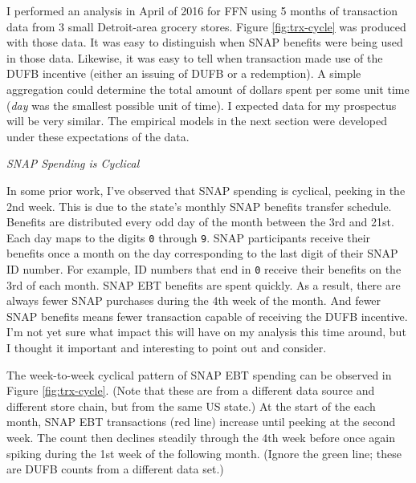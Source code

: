 \documentclass[12pt,letterpaperpaper,]{book}
\begin{document}
I performed an analysis in April of 2016 for FFN using 5 months of
transaction data from 3 small Detroit-area grocery stores. Figure
\ref{fig:trx-cycle} was produced with those data. It was easy to
distinguish when SNAP benefits were being used in those data. Likewise,
it was easy to tell when transaction made use of the DUFB incentive
(either an issuing of DUFB or a redemption). A simple aggregation could
determine the total amount of dollars spent per some unit time
(\emph{day} was the smallest possible unit of time). I expected data for
my prospectus will be very similar. The empirical models in the next
section were developed under these expectations of the data.

\emph{SNAP Spending is Cyclical}

In some prior work, I've observed that SNAP spending is cyclical,
peeking in the 2nd week. This is due to the state's monthly SNAP
benefits transfer schedule. Benefits are distributed every odd day of
the month between the 3rd and 21st. Each day maps to the digits
\texttt{0} through \texttt{9}. SNAP participants receive their benefits
once a month on the day corresponding to the last digit of their SNAP ID
number. For example, ID numbers that end in \texttt{0} receive their
benefits on the 3rd of each month. SNAP EBT benefits are spent quickly.
As a result, there are always fewer SNAP purchases during the 4th week
of the month. And fewer SNAP benefits means fewer transaction capable of
receiving the DUFB incentive. I'm not yet sure what impact this will
have on my analysis this time around, but I thought it important and
interesting to point out and consider.

The week-to-week cyclical pattern of SNAP EBT spending can be observed
in Figure \ref{fig:trx-cycle}. (Note that these are from a different
data source and different store chain, but from the same US state.) At
the start of the each month, SNAP EBT transactions (red line) increase
until peeking at the second week. The count then declines steadily
through the 4th week before once again spiking during the 1st week of
the following month. (Ignore the green line; these are DUFB counts from
a different data set.)
\end{document}
